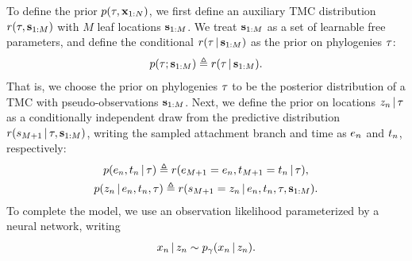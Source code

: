 To define the \acronym\;prior $p(\tau, \mathbf{x}_{1:N})$, we first define an auxiliary TMC distribution $r(\tau, \mathbf{s}_{1:M})$ with $M$ leaf locations $\mathbf{s}_{1:M}$.
We treat $\mathbf{s}_{1:M}$ as a set of learnable free parameters, and define the conditional $r(\tau \,|\, \mathbf{s}_{1:M})$ as the \acronym\;prior on phylogenies $\tau$:
\begin{equation}
  p(\tau ; \mathbf{s}_{1:M}) \triangleq r(\tau \,|\, \mathbf{s}_{1:M}).
\end{equation}
That is, we choose the prior on phylogenies $\tau$ to be the posterior distribution of a TMC with pseudo-observations $\mathbf{s}_{1:M}$.
Next, we define the \acronym\;prior on locations $z_n\,|\,\tau$ as a conditionally independent draw from the predictive distribution $r(s_{M+1} \,|\, \tau, \mathbf{s}_{1:M})$, writing the sampled attachment branch and time as $e_n$ and $t_n$, respectively:
\begin{gather}
    p(e_n, t_n \,|\, \tau)
    \triangleq r(e_{M+1} = e_n, t_{M+1} = t_n \,|\, \tau),
    \notag
    \\
    p(z_n \,|\, e_n, t_n, \tau)
    \triangleq r(s_{M+1} = z_n \,|\, e_n, t_n, \tau, \mathbf{s}_{1:M}).
\end{gather}
To complete the model, we use an observation likelihood parameterized by a neural network, writing
\begin{equation}
    x_n \,|\, z_n \sim p_\gamma(x_n \,|\, z_n).
\end{equation}
%
%
